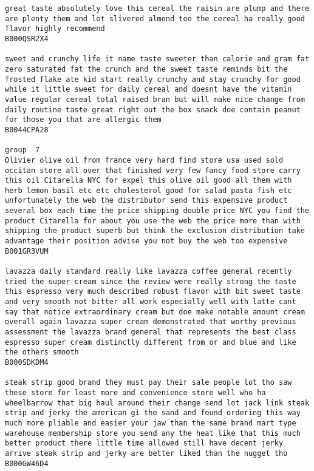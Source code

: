 \documentclass[11pt]{article}
\begin{document}
\begin{Verbatim}[commandchars=\\\{\}]
great taste absolutely love this cereal the raisin are plump and there are plenty them and lot slivered almond too the cereal ha really good flavor highly recommend
B000QSR2X4

sweet and crunchy life it name taste sweeter than calorie and gram fat zero saturated fat the crunch and the sweet taste reminds bit the frosted flake ate kid start really crunchy and stay crunchy for good while it little sweet for daily cereal and doesnt have the vitamin value regular cereal total raised bran but will make nice change from daily routine taste great right out the box snack doe contain peanut for those you that are allergic them
B0044CPA28

group  7
Olivier olive oil from france very hard find store usa used sold occitan store all over that finished very few fancy food store carry this oil Citarella NYC for expel this olive oil good all them with herb lemon basil etc etc cholesterol good for salad pasta fish etc unfortunately the web the distributor send this expensive product several box each time the price shipping double price NYC you find the product Citarella for about you use the web the price more than with shipping the product superb but think the exclusion distribution take advantage their position advise you not buy the web too expensive
B001GR3VUM

lavazza daily standard really like lavazza coffee general recently tried the super cream since the review were really strong the taste this espresso very much described robust flavor with bit sweet taste and very smooth not bitter all work especially well with latte cant say that notice extraordinary cream but doe make notable amount cream overall again lavazza super cream demonstrated that worthy previous assessment the lavazza brand general that represents the best class espresso super cream distinctly different from or and blue and like the others smooth
B000SDKDM4

steak strip good brand they must pay their sale people lot tho saw these store for least more and convenience store well who ha wheelbarrow that big haul around their change send lot jack link steak strip and jerky the american gi the sand and found ordering this way much more pliable and easier your jaw than the same brand mart type warehouse membership store you send any the heat like that this much better product there little time allowed still have decent jerky arrive steak strip and jerky are better liked than the nugget tho
B000GW46D4


\end{Verbatim}
\end{document}
